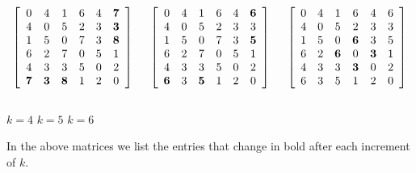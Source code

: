 \begin{Boxample}[0]
\begin{samepage}
{\[
\left[
\begin{array}{cccccc} %
0    & 4   & 1   & 6    & 4    & \textbf{7} \\
4    & 0   & 5   & 2    & 3    & \textbf{3} \\
1    & 5   & 0   & 7    & 3    & \textbf{8} \\
6    & 2   & 7   & 0    & 5    & 1 \\
4    & 3   & 3   & 5    & 0    & 2 \\
\textbf{7} &\textbf{3} & \textbf{8} & 1    & 2    & 0 \\
\end{array}
\right]
\hspace{.5cm}
\left[
\begin{array}{cccccc} %
0    & 4   & 1     & 6    & 4    & \textbf{6} \\
4    & 0   & 5     & 2    & 3    & 3 \\
1    & 5   & 0     & 7    & 3    & \textbf{5} \\
6    & 2   & 7     & 0    & 5    & 1 \\
4    & 3   & 3     & 5    & 0    & 2 \\
\textbf{6} & 3   & \textbf{5} & 1    & 2    & 0 \\
\end{array}
\right]
\hspace{.5cm}
\left[
\begin{array}{cccccc} %
0    & 4   & 1     & 6    & 4    & 6 \\
4    & 0   & 5     & 2    & 3    & 3 \\
1    & 5   & 0     & \textbf{6} & 3    & 5 \\
6    & 2   & \textbf{6} & 0    & \textbf{3} & 1 \\
4    & 3   & 3     & \textbf{3} & 0    & 2 \\
6    & 3   & 5     & 1    & 2    & 0 \\
\end{array}
\right]
\]\\[-5pt]
\hspace*{1in} $k=4$ \hspace{1.2in} $k=5$ \hspace{1.2in} $k=6$
\\
} %
\end{samepage}

In the above matrices we list the entries that change in bold after each
increment of $k$. 
\end{Boxample}

